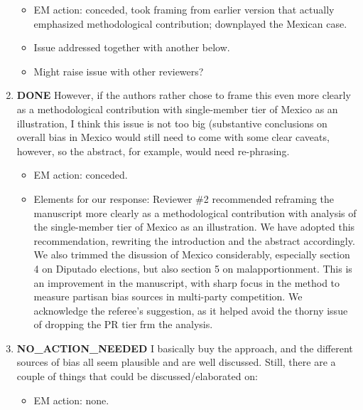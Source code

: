 \documentclass{article}
\begin{document}
\begin{enumerate}
\label{sec:orgheadline6}
\begin{itemize}
\item EM action: conceded, took framing from earlier version that actually emphasized methodological contribution; downplayed the Mexican case.
\item Issue addressed together with another below.
\item Might raise issue with other reviewers?
\end{itemize}
\item {\bfseries\sffamily DONE} However, if the authors rather chose to frame this even more clearly as a methodological contribution with single-member tier of Mexico as an illustration, I think this issue is not too big (substantive conclusions on overall bias in Mexico would still need to come with some clear caveats, however, so the abstract, for example, would need re-phrasing.
\label{sec:orgheadline7}
\begin{itemize}
\item EM action: conceded.
\item Elements for our response: Reviewer \#2 recommended reframing the manuscript more clearly as a methodological contribution with analysis of the single-member tier of Mexico as an illustration. We have adopted this recommendation, rewriting the introduction and the abstract accordingly. We also trimmed the disussion of Mexico considerably, especially section 4 on Diputado elections, but also section 5 on malapportionment. This is an improvement in the manuscript, with sharp focus in the method to measure partisan bias sources in multi-party competition. We acknowledge the referee's suggestion, as it helped avoid the thorny issue of dropping the PR tier frm the analysis.
\end{itemize}
\item {\bfseries\sffamily NO\_ACTION\_NEEDED} I basically buy the approach, and the different sources of bias all seem plausible and are well discussed. Still, there are a couple of things that could be discussed/elaborated on:
\label{sec:orgheadline8}
\begin{itemize}
\item EM action: none.
\end{itemize}

\end{enumerate}
\end{document}
